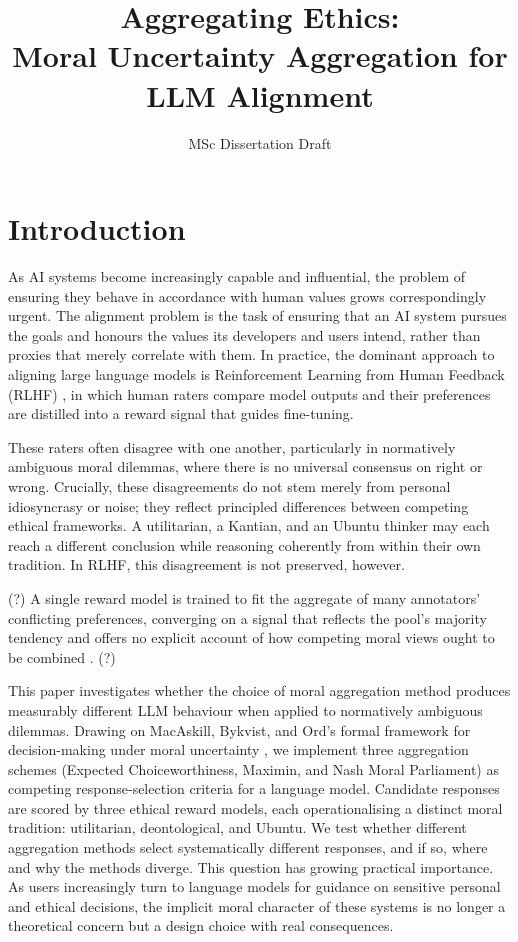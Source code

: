 \documentclass[10pt,twocolumn,a4paper]{article}
\title{\textbf{Aggregating Ethics:}\\ Moral Uncertainty Aggregation for LLM Alignment}
\author{MSc Dissertation Draft}
\date{}
\begin{document}
\raggedbottom
\maketitle

\section{Introduction}

As AI systems become increasingly capable and influential, the problem of ensuring they behave in accordance with human values grows correspondingly urgent. The alignment problem \cite{christian2020} is the task of ensuring that an AI system pursues the goals and honours the values its developers and users intend, rather than proxies that merely correlate with them. In practice, the dominant approach to aligning large language models is Reinforcement Learning from Human Feedback (RLHF) \cite{ouyang2022}, in which human raters compare model outputs and their preferences are distilled into a reward signal that guides fine-tuning.

These raters often disagree with one another, particularly in normatively ambiguous moral dilemmas, where there is no universal consensus on right or wrong. Crucially, these disagreements do not stem merely from personal idiosyncrasy or noise; they reflect principled differences between competing ethical frameworks. A utilitarian, a Kantian, and an Ubuntu thinker may each reach a different conclusion while reasoning coherently from within their own tradition. In RLHF, this disagreement is not preserved, however. 


(?)
A single reward model is trained to fit the aggregate of many annotators' conflicting preferences, converging on a signal that reflects the pool's majority tendency and offers no explicit account of how competing moral views ought to be combined \cite{casper2023}.
(?)

This paper investigates whether the choice of moral aggregation method produces measurably different LLM behaviour when applied to normatively ambiguous dilemmas. Drawing on MacAskill, Bykvist, and Ord's formal framework for decision-making under moral uncertainty \cite{macaskill2020}, we implement three aggregation schemes (Expected Choiceworthiness, Maximin, and Nash Moral Parliament) as competing response-selection criteria for a language model. Candidate responses are scored by three ethical reward models, each operationalising a distinct moral tradition: utilitarian, deontological, and Ubuntu. We test whether different aggregation methods select systematically different responses, and if so, where and why the methods diverge. This question has growing practical importance. As users increasingly turn to language models for guidance on sensitive personal and ethical decisions, the implicit moral character of these systems is no longer a theoretical concern but a design choice with real consequences.
\end{document}
